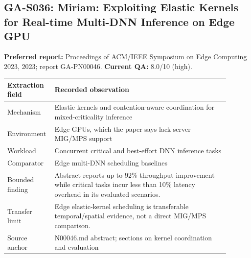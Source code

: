 \subsection{GA-S036: Miriam: Exploiting Elastic Kernels for Real-time Multi-DNN Inference on Edge GPU}
\textbf{Preferred report:} Proceedings of ACM/IEEE Symposium on Edge Computing 2023, 2023; report GA-PN00046. \textbf{Current QA:} 8.0/10 (high).
\begin{longtable}{P{0.15\linewidth}P{0.75\linewidth}}
\toprule Extraction field & Recorded observation\\\midrule\endhead
Mechanism & Elastic kernels and contention-aware coordination for mixed-criticality inference\\
Environment & Edge GPUs, which the paper says lack server MIG/MPS support\\
Workload & Concurrent critical and best-effort DNN inference tasks\\
Comparator & Edge multi-DNN scheduling baselines\\
Bounded finding & Abstract reports up to 92\% throughput improvement while critical tasks incur less than 10\% latency overhead in its evaluated scenarios.\\
Transfer limit & Edge elastic-kernel scheduling is transferable temporal/spatial evidence, not a direct MIG/MPS comparison.\\
Source anchor & N00046.md abstract; sections on kernel coordination and evaluation\\
\bottomrule\end{longtable}
